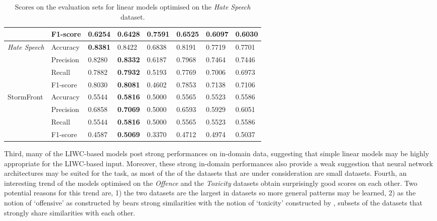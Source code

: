 \begin{table}[]
\begin{minipage}{0.42\paperheight}
{\begin{tabular}{ll|ll|ll|ll}
                                           & F1-score  & 0.6254       & 0.6428           & \bf{0.7591} & 0.6525        & 0.6097      & 0.6030      \\ \hline
    \multirow{4}{*}{\textit{Hate Speech}}  & Accuracy  & \bf{0.8381}  & 0.8422           & 0.6838      & 0.8191        & 0.7719      & 0.7701      \\
                                           & Precision & 0.8280       & \bf{0.8332}      & 0.6187      & 0.7968        & 0.7464      & 0.7446      \\
                                           & Recall    & 0.7882       & \bf{0.7932}      & 0.5193      & 0.7769        & 0.7006      & 0.6973      \\
                                           & F1-score  & 0.8030       & \bf{0.8081}      & 0.4602      & 0.7853        & 0.7138      & 0.7106      \\ \hline
    \multirow{4}{*}{StormFront}            & Accuracy  & 0.5544       & \bf{0.5816}      & 0.5000      & 0.5565        & 0.5523      & 0.5586      \\
                                           & Precision & 0.6858       & \bf{0.7069}      & 0.5000      & 0.6593        & 0.5929      & 0.6051      \\
                                           & Recall    & 0.5544       & \bf{0.5816}      & 0.5000      & 0.5565        & 0.5523      & 0.5586      \\
                                           & F1-score  & 0.4587       & \bf{0.5069}      & 0.3370      & 0.4712        & 0.4974      & 0.5037
    \end{tabular}%
    }
    \caption{Scores on the evaluation sets for linear models optimised on the \textit{Hate Speech} dataset.}
    \label{tab:linear_hatespeech_baselines}
\end{minipage}
\end{table}

Third, many of the LIWC-based models post strong performances on in-domain data, suggesting that simple linear models may be highly appropriate for the LIWC-based input.
Moreover, these strong in-domain performances also provide a weak suggestion that neural network architectures may be  suited for the task, as most of the of the datasets that are under consideration are small datasets.
Fourth, an interesting trend of the models optimised on the \textit{Offence} and the \textit{Toxicity} datasets obtain surprisingly good scores on each other.
Two potential reasons for this trend are, 1) the two datasets are the largest in datasets so more general patterns may be learned, 2) as the notion of `offensive' as constructed by \citet{Davidson:2017} bears strong similarities with the notion of `toxicity' constructed by \citet{Wulczyn:2017},  subsets of the datasets that strongly share similarities with each other.

